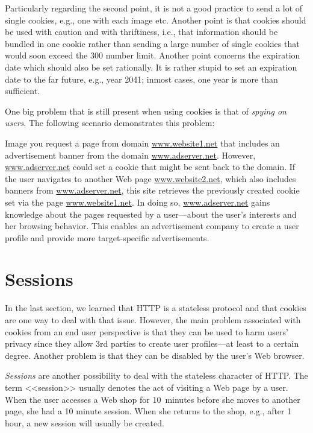 \documentclass[a4paper, justified, notoc]{tufte-handout} %
\begin{document}
Particularly regarding the second point, it is not a good practice to send a lot of single cookies, e.g., one with each image etc. Another point is that cookies should be used with caution and with thriftiness, i.e., that information should be bundled in one cookie rather than sending a large number of single cookies that would soon exceed the 300 number limit. 
Another point concerns the expiration date which should also be set rationally. It is rather stupid to set an expiration date to the far future, e.g., year 2041; inmost cases, one year is more than sufficient.

One big problem that is still present when using cookies is that of \emph{spying on users}. The following scenario demonstrates this problem:
 
Image you request a page from domain \url{www.website1.net} that includes an advertisement banner from the domain \url{www.adserver.net}. However, \url{www.adserver.net} could set a cookie that might be sent back to the domain. 
If the user navigates to another Web page \url{www.website2.net}, which also includes banners from \url{www.adserver.net}, this site retrieves the previously created cookie set via the page \url{www.website1.net}.
In doing so, \url{www.adserver.net} gains knowledge about the pages requested by a user---about the user's interests and her browsing behavior. 
This enables an advertisement company to create a user profile and provide more target-specific advertisements.



\section{Sessions}%
\label{sec:sessions}
In the last section, we learned that HTTP is a stateless protocol and that cookies are one way to deal with that issue.
However, the main problem associated with cookies from an end user perspective is that they can be used to harm users' privacy since they allow 3rd parties to create user profiles---at least to a certain degree. Another problem is that they can be disabled by the user's Web browser.

\emph{Sessions} are another possibility to deal with the stateless character of HTTP. The term <<session>> usually denotes the act of visiting a Web page by a user. %
When the user accesses a Web shop for 10~minutes before she moves to another page, she had a 10 minute session. When she returns to the shop, e.g., after 1 hour, a new session will usually be created.  
\end{document}
